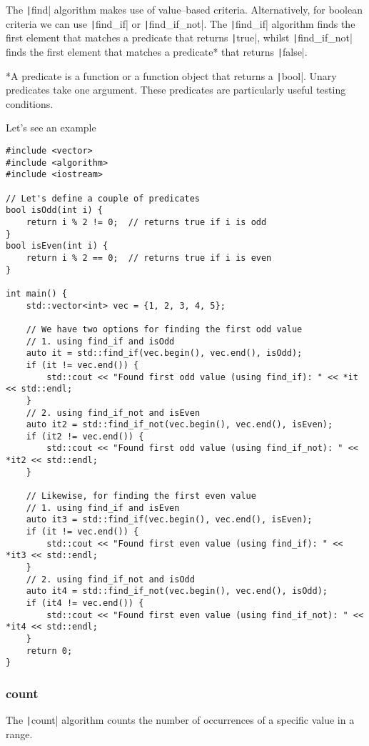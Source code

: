 \documentclass{article}
\begin{document}
The \texttt|find| algorithm makes use of value--based criteria. Alternatively, for boolean criteria we can use \texttt|find_if| or \texttt|find_if_not|.
The \texttt|find_if| algorithm finds the first element that matches a predicate that returns \texttt|true|, whilst \texttt|find_if_not| finds the first element that matches a predicate* that returns \texttt|false|. 

*A predicate is a function or a function object that returns a \texttt|bool|.
Unary predicates take one argument. These predicates are particularly useful testing conditions.

Let's see an example

\begin{verbatim}
#include <vector>
#include <algorithm>
#include <iostream>

// Let's define a couple of predicates
bool isOdd(int i) {
    return i % 2 != 0;  // returns true if i is odd
}
bool isEven(int i) {
    return i % 2 == 0;  // returns true if i is even
}

int main() {
    std::vector<int> vec = {1, 2, 3, 4, 5};
    
    // We have two options for finding the first odd value
    // 1. using find_if and isOdd
    auto it = std::find_if(vec.begin(), vec.end(), isOdd);
    if (it != vec.end()) {
        std::cout << "Found first odd value (using find_if): " << *it << std::endl;
    }
    // 2. using find_if_not and isEven
    auto it2 = std::find_if_not(vec.begin(), vec.end(), isEven);
    if (it2 != vec.end()) {
        std::cout << "Found first odd value (using find_if_not): " << *it2 << std::endl;
    }
    
    // Likewise, for finding the first even value
    // 1. using find_if and isEven
    auto it3 = std::find_if(vec.begin(), vec.end(), isEven);
    if (it != vec.end()) {
        std::cout << "Found first even value (using find_if): " << *it3 << std::endl;
    }
    // 2. using find_if_not and isOdd
    auto it4 = std::find_if_not(vec.begin(), vec.end(), isOdd);
    if (it4 != vec.end()) {
        std::cout << "Found first even value (using find_if_not): " << *it4 << std::endl;
    }    
    return 0;
}
\end{verbatim}

\subsubsection{count}
The \texttt|count| algorithm counts the number of occurrences of a specific value in a range.
\end{document}
